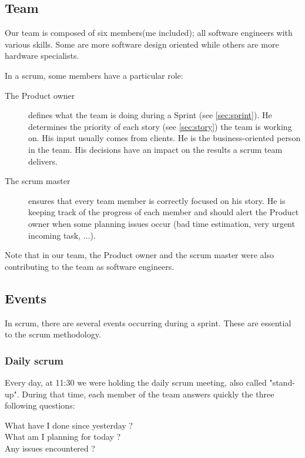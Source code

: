 \subsection{Team}
Our team is composed of six members(me included); all software engineers with various
skills. Some are more software design oriented while others are more hardware
specialists.

In a \gls{scrum}, some members have a particular role:
\begin{description}
    \item[The Product owner]
        defines what the team is doing during a Sprint (see \ref{sec:sprint}).
        He determines the priority of each story (see \ref{sec:story}) the team is working on. His input usually comes from
        clients. He is the business-oriented person in the team. His decisions have an impact on the results a \gls{scrum} team delivers.
    \item[The scrum master]
        ensures that every team member is correctly focused on his story. He is keeping track of the progress of each member and
        should alert the Product owner when some planning issues occur (bad time estimation, very urgent incoming task, ...).
\end{description}

Note that in our team, the Product owner and the \gls{scrum} master were also contributing to the team as software engineers.

\subsection{Events}
In \gls{scrum}, there are several events occurring during a sprint.
These are essential to the \gls{scrum} methodology.

\subsubsection{Daily scrum}
Every day, at 11:30 we were holding the daily \gls{scrum} meeting, also called "stand-up".
During that time, each member of the team answers quickly the three following questions:

\begin{description}
    \item[What have I done since yesterday ?]
    \item[What am I planning for today ?]
    \item[Any issues encountered ?]
\end{description}

